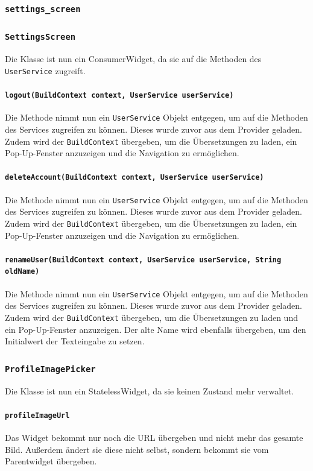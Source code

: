 \documentclass{implementierungsheft}
\begin{document}
\subsubsection{\texttt{settings\_screen}}
\subsubsection*{\texttt{SettingsScreen}}
Die Klasse ist nun ein ConsumerWidget, da sie auf die Methoden des \texttt{UserService} zugreift.
\paragraph{\texttt{logout(BuildContext context, UserService userService)}}
Die Methode nimmt nun ein \texttt{UserService} Objekt entgegen, um auf die Methoden des Services zugreifen zu können. Dieses wurde zuvor aus dem Provider geladen. Zudem wird der \texttt{BuildContext} übergeben, um die Übersetzungen zu laden, ein Pop-Up-Fenster anzuzeigen und die Navigation zu ermöglichen.
\paragraph{\texttt{deleteAccount(BuildContext context, UserService userService)}}
Die Methode nimmt nun ein \texttt{UserService} Objekt entgegen, um auf die Methoden des Services zugreifen zu können. Dieses wurde zuvor aus dem Provider geladen. Zudem wird der \texttt{BuildContext} übergeben, um die Übersetzungen zu laden, ein Pop-Up-Fenster anzuzeigen und die Navigation zu ermöglichen.
\paragraph{\texttt{renameUser(BuildContext context, UserService userService, String oldName)}}
Die Methode nimmt nun ein \texttt{UserService} Objekt entgegen, um auf die Methoden des Services zugreifen zu können. Dieses wurde zuvor aus dem Provider geladen. Zudem wird der \texttt{BuildContext} übergeben, um die Übersetzungen zu laden und ein Pop-Up-Fenster anzuzeigen. Der alte Name wird ebenfalls übergeben, um den Initialwert der Texteingabe zu setzen.
\subsubsection*{\texttt{ProfileImagePicker}}
Die Klasse ist nun ein StatelessWidget, da sie keinen Zustand mehr verwaltet.
\paragraph{\texttt{profileImageUrl}}
Das Widget bekommt nur noch die URL übergeben und nicht mehr das gesamte Bild. Außerdem ändert sie diese nicht selbst, sondern bekommt sie vom Parentwidget übergeben.
\end{document}
